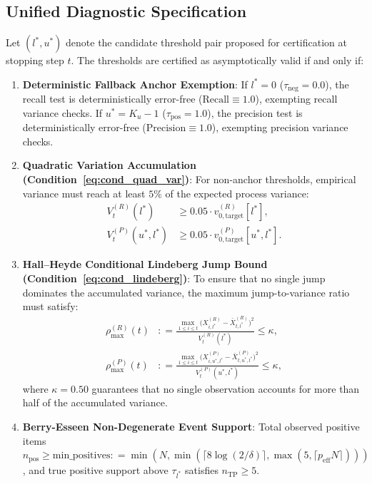 \documentclass[11pt,a4paper]{article}
\newcommand{\coloneqq}{\mathrel{\mathop:}=}
\begin{document}
\subsection{Unified Diagnostic Specification}
Let $(l^*, u^*)$ denote the candidate threshold pair proposed for certification at stopping step $t$. The thresholds are certified as asymptotically valid if and only if:
\begin{enumerate}[leftmargin=*]
    \item \textbf{Deterministic Fallback Anchor Exemption}:
    If $l^* = 0$ ($\tau_{\text{neg}} = 0.0$), the recall test is deterministically error-free ($\text{Recall} \equiv 1.0$), exempting recall variance checks. If $u^* = K_u - 1$ ($\tau_{\text{pos}} = 1.0$), the precision test is deterministically error-free ($\text{Precision} \equiv 1.0$), exempting precision variance checks.
    
    \item \textbf{Quadratic Variation Accumulation (Condition~\ref{eq:cond_quad_var})}:
    For non-anchor thresholds, empirical variance must reach at least $5\%$ of the expected process variance:
    \begin{align}
    V_t^{(R)}(l^*) &\ge 0.05 \cdot v_{0, \text{target}}^{(R)}[l^*], \label{eq:check_var_r} \\
    V_t^{(P)} (u^*, l^*) &\ge 0.05 \cdot v_{0, \text{target}}^{(P)}[u^*, l^*]. \label{eq:check_var_p}
    \end{align}
    
    \item \textbf{Hall--Heyde Conditional Lindeberg Jump Bound (Condition~\ref{eq:cond_lindeberg})}:
    To ensure that no single jump dominates the accumulated variance, the maximum jump-to-variance ratio must satisfy:
    \begin{align}
    \rho_{\max}^{(R)}(t) &\coloneqq \frac{\max_{1 \le i \le t} \big(X_{i, l^*}^{(R)} - \bar{X}_{t, l^*}^{(R)}\big)^2}{V_t^{(R)}(l^*)} \le \kappa, \label{eq:check_jump_r} \\
    \rho_{\max}^{(P)}(t) &\coloneqq \frac{\max_{1 \le i \le t} \big(X_{i, u^*, l^*}^{(P)} - \bar{X}_{t, u^*, l^*}^{(P)}\big)^2}{V_t^{(P)}(u^*, l^*)} \le \kappa, \label{eq:check_jump_p}
    \end{align}
    where $\kappa = 0.50$ guarantees that no single observation accounts for more than half of the accumulated variance.
    
    \item \textbf{Berry-Esseen Non-Degenerate Event Support}:
    Total observed positive items $n_{\text{pos}} \ge \text{min\_positives} \coloneqq \min(N, \min(\lceil 8 \log(2/\delta) \rceil, \max(5, \lceil p_{\text{eff}} N \rceil)))$, and true positive support above $\tau_{l^*}$ satisfies $n_{\text{TP}} \ge 5$.
\end{enumerate}
\end{document}
